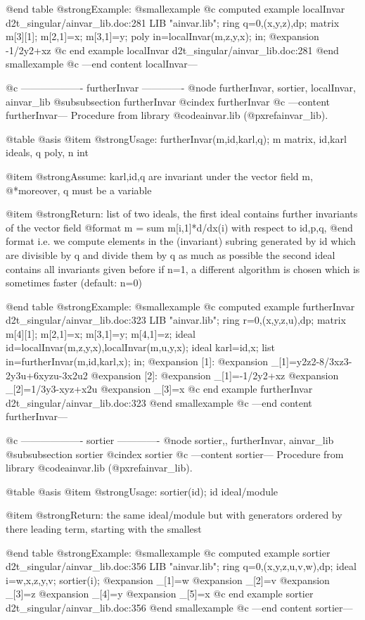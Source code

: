 @end table
@strong{Example:}
@smallexample
@c computed example localInvar d2t_singular/ainvar_lib.doc:281 
LIB "ainvar.lib";
ring q=0,(x,y,z),dp;
matrix m[3][1];
m[2,1]=x;
m[3,1]=y;
poly in=localInvar(m,z,y,x);
in;
@expansion{} -1/2y2+xz
@c end example localInvar d2t_singular/ainvar_lib.doc:281
@end smallexample
@c ---end content localInvar---

@c ------------------- furtherInvar -------------
@node furtherInvar, sortier, localInvar, ainvar_lib
@subsubsection furtherInvar
@cindex furtherInvar
@c ---content furtherInvar---
Procedure from library @code{ainvar.lib} (@pxref{ainvar_lib}).

@table @asis
@item @strong{Usage:}
furtherInvar(m,id,karl,q); m matrix, id,karl ideals, q poly, n int

@item @strong{Assume:}
karl,id,q are invariant under the vector field m,
@*moreover, q must be a variable

@item @strong{Return:}
list of two ideals, the first ideal contains further invariants of
the vector field
@format
         m = sum m[i,1]*d/dx(i) with respect to id,p,q,
@end format
i.e. we compute elements in the (invariant) subring generated by id
which are divisible by q and divide them by q as much as possible
the second ideal contains all invariants given before
if n=1, a different algorithm is chosen which is sometimes faster
(default: n=0)

@end table
@strong{Example:}
@smallexample
@c computed example furtherInvar d2t_singular/ainvar_lib.doc:323 
LIB "ainvar.lib";
ring r=0,(x,y,z,u),dp;
matrix m[4][1];
m[2,1]=x;
m[3,1]=y;
m[4,1]=z;
ideal id=localInvar(m,z,y,x),localInvar(m,u,y,x);
ideal karl=id,x;
list in=furtherInvar(m,id,karl,x);
in;
@expansion{} [1]:
@expansion{}    _[1]=y2z2-8/3xz3-2y3u+6xyzu-3x2u2
@expansion{} [2]:
@expansion{}    _[1]=-1/2y2+xz
@expansion{}    _[2]=1/3y3-xyz+x2u
@expansion{}    _[3]=x
@c end example furtherInvar d2t_singular/ainvar_lib.doc:323
@end smallexample
@c ---end content furtherInvar---

@c ------------------- sortier -------------
@node sortier,, furtherInvar, ainvar_lib
@subsubsection sortier
@cindex sortier
@c ---content sortier---
Procedure from library @code{ainvar.lib} (@pxref{ainvar_lib}).

@table @asis
@item @strong{Usage:}
sortier(id); id ideal/module

@item @strong{Return:}
the same ideal/module but with generators ordered by there
leading term, starting with the smallest

@end table
@strong{Example:}
@smallexample
@c computed example sortier d2t_singular/ainvar_lib.doc:356 
LIB "ainvar.lib";
ring q=0,(x,y,z,u,v,w),dp;
ideal i=w,x,z,y,v;
sortier(i);
@expansion{} _[1]=w
@expansion{} _[2]=v
@expansion{} _[3]=z
@expansion{} _[4]=y
@expansion{} _[5]=x
@c end example sortier d2t_singular/ainvar_lib.doc:356
@end smallexample
@c ---end content sortier---
